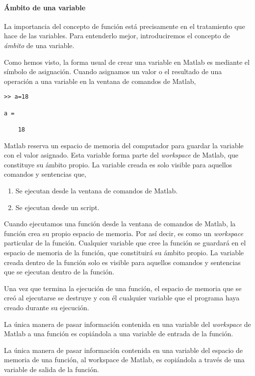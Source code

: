 \paragraph{Ámbito de una variable} La importancia del concepto de función está precisamente en el tratamiento que hace de las variables. Para entenderlo mejor, introduciremos el concepto de \emph{ámbito} de una variable.

Como hemos visto, la forma usual de crear una variable en Matlab es mediante el símbolo de asignación. Cuando asignamos un valor o el resultado de una operación a una variable en la ventana de comandos de Matlab,

\begin{verbatim}
>> a=18

a =

    18

\end{verbatim} 
 
Matlab reserva un espacio de memoria del computador para guardar la variable con el valor asignado. Esta variable forma parte del \emph{workspace} de Matlab, que constituye su ámbito propio. La variable creada es solo visible para aquellos comandos y sentencias que,
\begin{enumerate}
\item Se ejecutan desde la ventana de comandos de Matlab.
\item Se ejecutan desde un script.
\end{enumerate}

Cuando ejecutamos una función desde la ventana de comandos de Matlab, la función crea su propio espacio de memoria. Por así decir, es como un \emph{workspace} particular de la función. Cualquier variable que cree la función se guardará en el espacio de memoria de la función, que constituirá su ámbito propio. La variable creada dentro de la función solo es visible para aquellos comandos y sentencias que se ejecutan dentro de la función.

Una vez que termina la ejecución de una función, el espacio de memoria que se creó al ejecutarse se destruye y con él cualquier variable que el programa haya creado durante su ejecución.

La única manera de pasar información contenida en una variable del \emph{workspace} de Matlab a una función es copiándola a una variable de entrada de la función.

La única manera de pasar información contenida en una variable del espacio de memoria de una función, al workspace de Matlab, es copiándola a través de una variable de salida de la función.


